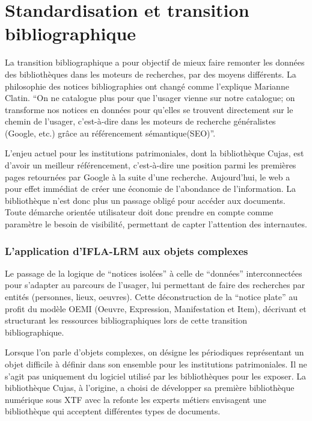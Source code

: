 \section{Standardisation et transition bibliographique}
La transition bibliographique a pour objectif de mieux faire remonter les données des bibliothèques dans les moteurs de recherches, par des moyens différents. La philosophie des notices bibliographies ont changé comme l'explique Marianne Clatin. \enquote{On ne catalogue plus pour que l'usager vienne sur notre catalogue; on transforme nos notices en données pour qu'elles se trouvent directement sur le chemin de l'usager, c'est-à-dire dans les moteurs de recherche généralistes (Google, etc.) grâce au référencement sémantique(SEO)}.

L'enjeu actuel pour les institutions patrimoniales, dont la bibliothèque Cujas, est d'avoir un meilleur référencement, c'est-à-dire une position parmi les premières pages retournées par Google à la suite d'une recherche. Aujourd'hui, le web a pour effet immédiat de créer une économie de l'abondance de l'information. La bibliothèque n'est donc plus un passage obligé pour accéder aux documents. Toute démarche orientée utilisateur doit donc prendre en compte comme paramètre le besoin de visibilité, permettant de capter l'attention des internautes.

\subsubsection{L'application d'IFLA-LRM aux objets complexes}
Le passage de la logique de \enquote{notices isolées} à celle de \enquote{données} interconnectées pour s'adapter au parcours de l'usager, lui permettant de faire des recherches par entités (personnes, lieux, oeuvres). Cette déconstruction de la \enquote{notice plate} au profit du modèle OEMI (Oeuvre, Expression, Manifestation et Item), décrivant et structurant les ressources bibliographiques lors de cette transition bibliographique. 

Lorsque l'on parle d'objets complexes, on désigne les périodiques représentant un objet difficile à définir dans son ensemble pour les institutions patrimoniales. Il ne s'agit pas uniquement du logiciel utilisé par les bibliothèques pour les exposer. La bibliothèque Cujas, à l'origine, a choisi de développer sa première bibliothèque numérique sous XTF avec la refonte les experts métiers envisagent une bibliothèque qui acceptent différentes types de documents. 

